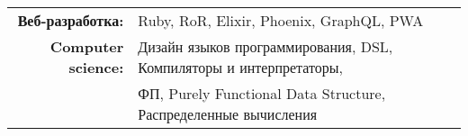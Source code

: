 
\vspace{1em}
\begin{tabular}{rl}

    \textbf{Веб-разработка:} & Ruby, RoR, Elixir, Phoenix, GraphQL, PWA \\
    \textbf{Computer science:} & Дизайн языков программирования, DSL, Компиляторы и интерпретаторы,\\
                               & ФП, Purely Functional Data Structure, Распределенные вычисления \\

\end{tabular}
